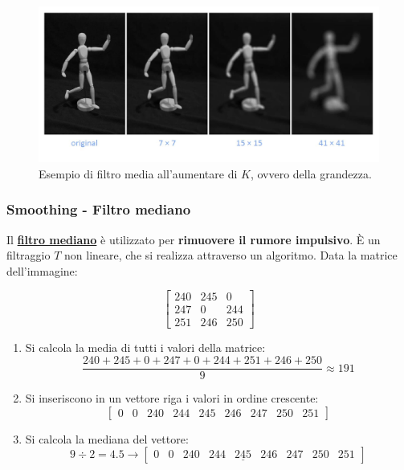 \documentclass[a4paper]{article}
\begin{document}
	\begin{figure}[!htp]
		\centering
		\includegraphics[width=\textwidth]{img/filtro_media.png}
		\caption{Esempio di filtro media all'aumentare di $K$, ovvero della grandezza.}
	\end{figure}

	\subsubsection{Smoothing - Filtro mediano}
	
	Il \textcolor{Red3}{\textbf{\underline{filtro mediano}}} è utilizzato per \textbf{rimuovere il rumore impulsivo}. È un filtraggio $T$ non lineare, che si realizza attraverso un algoritmo. Data la matrice dell'immagine:
	
	\begin{equation*}
		\begin{bmatrix}
			240 & 245 & 0   \\
			247 & 0   & 244 \\
			251 & 246 & 250
		\end{bmatrix}
	\end{equation*}

	\begin{enumerate}
		\item Si calcola la media di tutti i valori della matrice:
		\begin{equation*}
			\dfrac{240+245+0+247+0+244+251+246+250}{9} \approx 191
		\end{equation*}
	
		\item Si inseriscono in un vettore riga i valori in ordine crescente:
		\begin{equation*}
			\begin{bmatrix}
				0 & 0 & 240 & 244 & 245 & 246 & 247 & 250 & 251
			\end{bmatrix}
		\end{equation*}
	
		\item Si calcola la mediana del vettore:
		\begin{equation*}
			9 \div 2 = 4.5 \longrightarrow \begin{bmatrix}
				0 & 0 & 240 & 244 & \underline{245} & 246 & 247 & 250 & 251
			\end{bmatrix}
		\end{equation*}
	\end{enumerate}
\end{document}

